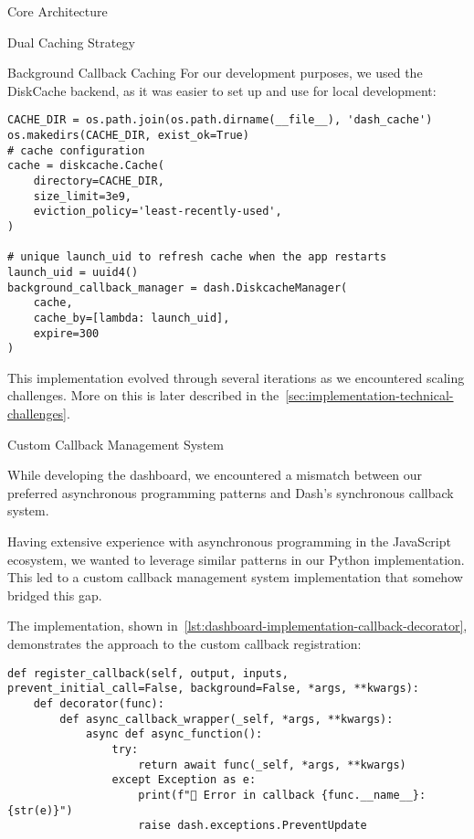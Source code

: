 \begin{section}{Core Architecture}
\begin{subsection}{Dual Caching Strategy}
\begin{subsubsection}{Background Callback Caching}
			For our development purposes, we used the DiskCache backend, as it was easier to set up and use for local development:

			\begin{listing}[H]
				\caption{DiskCache Background Callback Manager Setup}
				\begin{verbatim}
CACHE_DIR = os.path.join(os.path.dirname(__file__), 'dash_cache')
os.makedirs(CACHE_DIR, exist_ok=True)
# cache configuration
cache = diskcache.Cache(
	directory=CACHE_DIR,
	size_limit=3e9,
	eviction_policy='least-recently-used',
)

# unique launch_uid to refresh cache when the app restarts
launch_uid = uuid4()
background_callback_manager = dash.DiskcacheManager(
	cache,
	cache_by=[lambda: launch_uid],
	expire=300
)
				\end{verbatim}
				\label{lst:dashboard-implementation-callback-cache}
			\end{listing}

			This implementation evolved through several iterations as we encountered scaling challenges.
			More on this is later described in the~\autoref{sec:implementation-technical-challenges}.
		\end{subsubsection}
	\end{subsection}

	\begin{subsection}{Custom Callback Management System}
		\label{subsec:implementation-core-architecture-callbacks}

		While developing the dashboard, we encountered a mismatch between our preferred asynchronous programming patterns and Dash's synchronous callback system.

		Having extensive experience with asynchronous programming in the JavaScript ecosystem, we wanted to leverage similar patterns in our Python implementation.
		This led to a custom callback management system implementation that somehow bridged this gap.

		The implementation, shown in~\autoref{lst:dashboard-implementation-callback-decorator}, demonstrates the approach to the custom callback registration:

		\begin{listing}[H]
			\caption{Custom Callback Decorator Implementation}
			\begin{verbatim}
def register_callback(self, output, inputs, prevent_initial_call=False, background=False, *args, **kwargs):
    def decorator(func):
        def async_callback_wrapper(_self, *args, **kwargs):
            async def async_function():
                try:
                    return await func(_self, *args, **kwargs)
                except Exception as e:
                    print(f"🚨 Error in callback {func.__name__}: {str(e)}")
                    raise dash.exceptions.PreventUpdate


\end{verbatim}
\end{listing}
\end{subsection}
\end{section}
